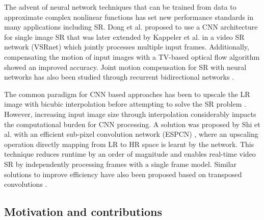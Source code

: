 \documentclass[10pt,twocolumn,letterpaper]{article}
\begin{document}
The advent of neural network techniques that can be trained from data to approximate complex nonlinear functions has set new performance standards in many applications including \gls{SR}. Dong et al. \cite{Dong2015} proposed to use a \gls{CNN} architecture for single image \gls{SR} that was later extended by Kappeler et al. \cite{Kappeler2016} in a video \gls{SR} network (VSRnet) which jointly processes multiple input frames. Additionally, compensating the motion of input images with a \gls{TV}-based optical flow algorithm showed an improved accuracy. Joint motion compensation for \gls{SR} with neural networks has also been studied through recurrent bidirectional networks \cite{Huang2015}.

The common paradigm for \gls{CNN} based approaches has been to upscale the \gls{LR} image with bicubic interpolation before attempting to solve the \gls{SR} problem \cite{Dong2015, Kappeler2016}. However, increasing input image size through interpolation considerably impacts the computational burden for \gls{CNN} processing. A solution was proposed by Shi et al. with an efficient sub-pixel convolution network (ESPCN) \cite{Shi2016}, where an upscaling operation directly mapping from \gls{LR} to \gls{HR} space is learnt by the network. This technique reduces runtime by an order of magnitude and enables real-time video \gls{SR} by independently processing frames with a single frame model. Similar solutions  to improve efficiency have also been proposed based on transposed convolutions \cite{Dong2016, Johnson2016}.



\subsection{Motivation and contributions}
\end{document}
